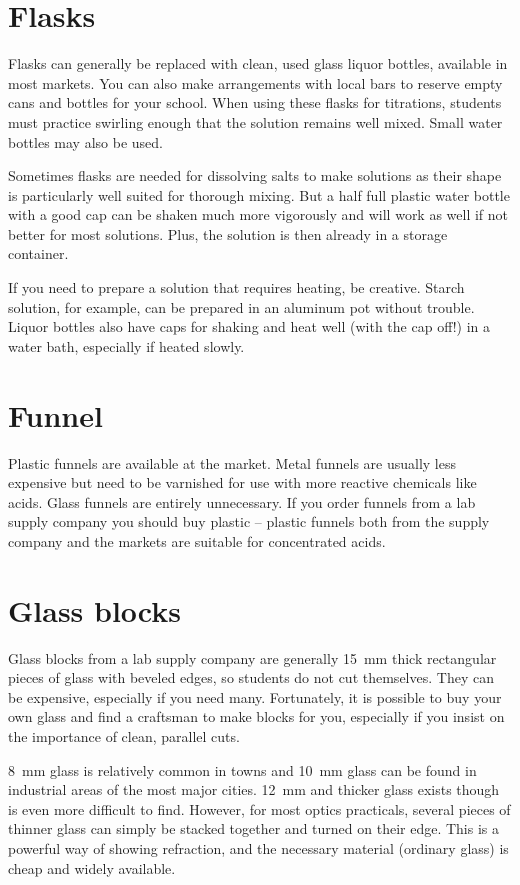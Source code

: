 \section{Flasks}
\label{sec:flasks}
Flasks can generally be replaced with clean, 
used glass liquor bottles, 
available in most markets. 
You can also make arrangements with local bars 
to reserve empty cans and bottles for your school. 
When using these flasks for titrations, 
students must practice swirling enough that the solution remains well mixed. 
Small water bottles may also be used.

Sometimes flasks are needed for dissolving salts 
to make solutions as their shape is particularly well suited 
for thorough mixing. 
But a half full plastic water bottle with a good cap 
can be shaken much more vigorously 
and will work as well if not better for most solutions. 
Plus, 
the solution is then already in a storage container.

If you need to prepare a solution that requires heating, 
be creative. 
Starch solution, 
for example, 
can be prepared in an aluminum pot without trouble. 
Liquor bottles also have caps for shaking and heat well 
(with the cap off!) in a water bath, 
especially if heated slowly.

\section{Funnel}
\label{sec:funnel}
Plastic funnels are available at the market. 
Metal funnels are usually less expensive 
but need to be varnished for use with more reactive chemicals like acids. 
Glass funnels are entirely unnecessary. 
If you order funnels from a lab supply company 
you should buy plastic -- 
plastic funnels both from the supply company and the markets 
are suitable for concentrated acids.

\section{Glass blocks}
\label{sec:glass-blocks}
Glass blocks from a lab supply company are 
generally 15~mm thick rectangular pieces of glass with beveled edges, 
so students do not cut themselves. 
They can be expensive, 
especially if you need many. 
Fortunately, 
it is possible to buy your own glass 
and find a craftsman to make blocks for you, 
especially if you insist on the importance of clean, 
parallel cuts. 
 
8~mm glass is relatively common in towns 
and 10~mm glass can be found in industrial areas of the most major cities. 
12~mm and thicker glass exists though is even more difficult to find. 
However, 
for most optics practicals, 
several pieces of thinner glass can simply be stacked together and 
turned on their edge. 
This is a powerful way of showing refraction, 
and the necessary material (ordinary glass) is cheap and widely available.

